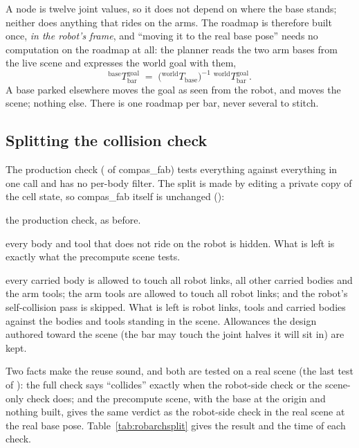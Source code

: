 \noindent
A node is twelve joint values, so it does not depend on where the base stands;
neither does anything that rides on the arms. The roadmap is therefore built once,
\emph{in the robot's frame}, and ``moving it to the real base pose'' needs no
computation on the roadmap at all: the planner reads the two arm bases from the
live scene and expresses the world goal with them,
\[
  {}^{\text{base}}T_{\text{bar}}^{\text{goal}} \;=\;
  \bigl({}^{\text{world}}T_{\text{base}}\bigr)^{-1}\; {}^{\text{world}}T_{\text{bar}}^{\text{goal}} .
\]
A base parked elsewhere moves the goal as seen from the robot, and moves the
scene; nothing else. There is one roadmap per bar, never several to stitch.

\subsection{Splitting the collision check}
\label{sec:split}

The production check ( of compas\_fab) tests
everything against everything in one call and has no per-body filter. The split
is made by editing a private copy of the cell state, so compas\_fab itself is
unchanged ():

\begin{description}[nosep,leftmargin=1.5em]
  \item[full] the production check, as before.
  \item[robot side] every body and tool that does not ride on the robot is hidden.
        What is left is exactly what the precompute scene tests.
  \item[scene only] every carried body is allowed to touch all robot links, all
        other carried bodies and the arm tools; the arm tools are allowed to touch
        all robot links; and the robot's self-collision pass is skipped. What is
        left is robot links, tools and carried bodies against the bodies and tools
        standing in the scene. Allowances the design authored toward the scene
        (the bar may touch the joint halves it will sit in) are kept.
\end{description}

\noindent
Two facts make the reuse sound, and both are tested on a real scene (the last
test of ): the full check says
``collides'' exactly when the robot-side check or the scene-only check does; and
the precompute scene, with the base at the origin and nothing built, gives the
same verdict as the robot-side check in the real scene at the real base pose.
Table~\ref{tab:robarchsplit} gives the result and the time of each check.


